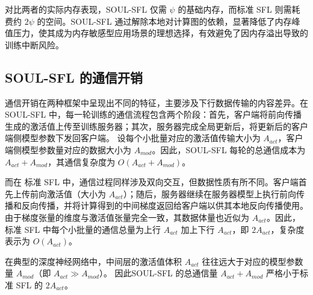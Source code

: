对比两者的实际内存表现，SOUL-SFL 仅需 $\psi$ 的基础内存，而标准 SFL 则需耗费约 $2\psi$ 的空间。SOUL-SFL 通过解除本地对计算图的依赖，显著降低了内存峰值压力，使其成为内存敏感型应用场景的理想选择，有效避免了因内存溢出导致的训练中断风险。

\subsection{SOUL-SFL 的通信开销}\label{sec:communication}

通信开销在两种框架中呈现出不同的特征，主要涉及下行数据传输的内容差异。在 SOUL-SFL 中，每一轮训练的通信流程包含两个阶段：首先，客户端将前向传播生成的激活值上传至训练服务器；其次，服务器完成全局更新后，将更新后的客户端侧模型参数下发回客户端。
设每个小批量对应的激活值传输大小为 $A_{act}$，客户端侧模型参数量对应的数据大小为 $A_{mod}$。因此，SOUL-SFL 每轮的总通信成本为 $A_{act} + A_{mod}$，其通信复杂度为 $O(A_{act} + A_{mod})$。

而在 标准 SFL 中，通信过程同样涉及双向交互，但数据性质有所不同。客户端首先上传前向激活值（大小为 $A_{act}$）；随后，服务器继续在服务器模型上执行前向传播和反向传播，并将计算得到的中间梯度返回给客户端以供其本地反向传播使用。
由于梯度张量的维度与激活值张量完全一致，其数据体量也近似为 $A_{act}$。因此，标准 SFL 中每个小批量的通信总量为上行 $A_{act}$ 加上下行 $A_{act}$，即 $2A_{act}$，复杂度表示为 $O(A_{act})$。

在典型的深度神经网络中，中间层的激活值体积 $A_{act}$ 往往远大于对应的模型参数量 $A_{mod}$（即 $A_{act} \gg A_{mod}$）。
因此SOUL-SFL 的总通信量 $A_{act} + A_{mod}$ 严格小于标准 SFL 的 $2A_{act}$。%


